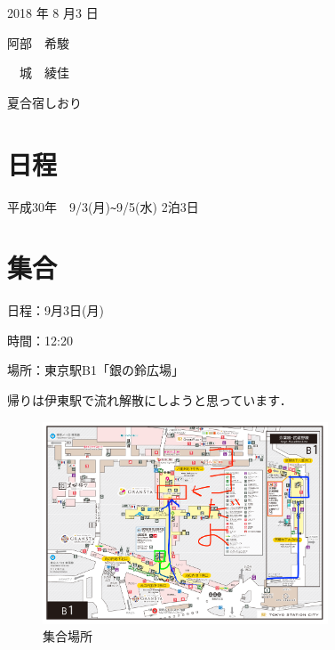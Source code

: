 \documentclass[a4j,11pt]{jsarticle}
\begin{document}
\begin{flushright} %
2018 年 8 月3 日

阿部　希駿

　城　綾佳
\end{flushright}
\begin{center} %
\Large{夏合宿しおり}
\end{center}

\section{日程} %
\label{sec:start} %
平成30年　9/3(月)\verb|~|9/5(水)     2泊3日

 
\section{集合} %
\label{sec:end} %
日程：9月3日(月)

時間：12:20

場所：東京駅B1「銀の鈴広場」

帰りは伊東駅で流れ解散にしようと思っています．

\begin{figure}[H]
\begin{center}
\includegraphics[width=85mm]{syuugo.pdf}
\end{center}
\caption{集合場所}
\label{fig:2}
\end{figure}
\end{document}
